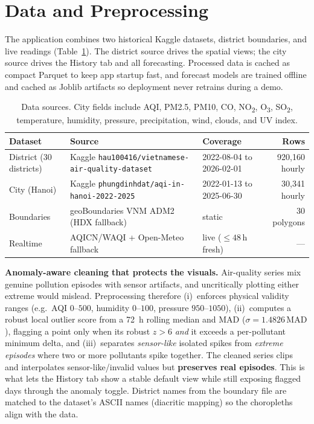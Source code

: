 \documentclass[a4paper]{article}
\begin{document}
\section{Data and Preprocessing}
The application combines two historical Kaggle datasets, district boundaries, and live readings
(Table~\ref{tab:data}). The district source drives the spatial views; the city source drives the History
tab and all forecasting. Processed data is cached as compact Parquet to keep app startup fast, and forecast
models are trained offline and cached as Joblib artifacts so deployment never retrains during a demo.

\begin{table}[h]
\centering
\small
\begin{tabular}{@{}lllr@{}}
\toprule
Dataset & Source & Coverage & Rows \\
\midrule
District (30 districts) & Kaggle \texttt{hau100416/vietnamese-air-quality-dataset} & 2022-08-04 to 2026-02-01 & 920{,}160 hourly \\
City (Hanoi) & Kaggle \texttt{phungdinhdat/aqi-in-hanoi-2022-2025} & 2022-01-13 to 2025-06-30 & 30{,}341 hourly \\
Boundaries & geoBoundaries VNM ADM2 (HDX fallback) & static & 30 polygons \\
Realtime & AQICN/WAQI + Open-Meteo fallback & live ($\le 48$\,h fresh) & --- \\
\bottomrule
\end{tabular}
\caption{Data sources. City fields include AQI, PM2.5, PM10, CO, NO\textsubscript{2}, O\textsubscript{3},
SO\textsubscript{2}, temperature, humidity, pressure, precipitation, wind, clouds, and UV index.}
\label{tab:data}
\end{table}

\noindent \textbf{Anomaly-aware cleaning that protects the visuals.}
Air-quality series mix genuine pollution episodes with sensor artifacts, and uncritically plotting either
extreme would mislead. Preprocessing therefore (i)~enforces physical validity ranges (e.g.\ AQI
$0$--$500$, humidity $0$--$100$, pressure $950$--$1050$), (ii)~computes a robust local outlier score from a
72~h rolling median and MAD ($\sigma = 1.4826\,\text{MAD}$), flagging a point only when its robust
$z>6$ \emph{and} it exceeds a per-pollutant minimum delta, and (iii)~separates \emph{sensor-like} isolated
spikes from \emph{extreme episodes} where two or more pollutants spike together. The cleaned series clips
and interpolates sensor-like/invalid values but \textbf{preserves real episodes}. This is what lets the
History tab show a stable default view while still exposing flagged days through the anomaly toggle.
District names from the boundary file are matched to the dataset's ASCII names (diacritic mapping) so the
choropleths align with the data.
\end{document}
